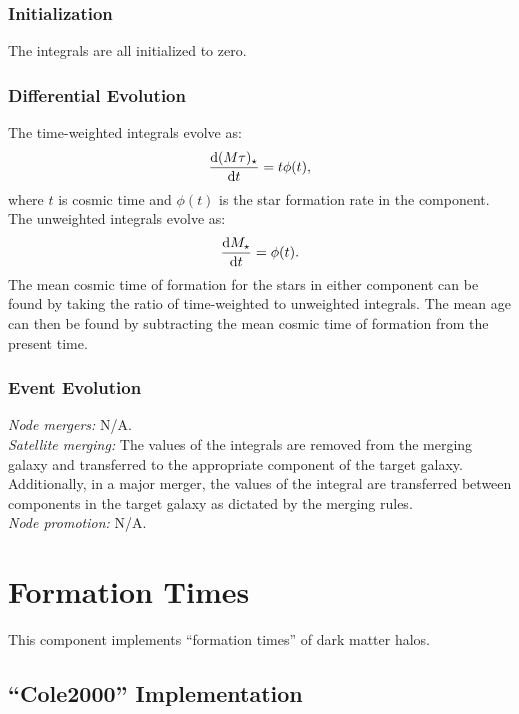 \subsubsection{Initialization}

The integrals are all initialized to zero.

\subsubsection{Differential Evolution}

The time-weighted integrals evolve as:
\begin{equation}
{{\rm d}({M\tau})_\star\over{\rm d}t} = t \phi(t),
\end{equation}
where $t$ is cosmic time and $\phi(t)$ is the star formation rate in the component. The unweighted integrals evolve as:
\begin{equation}
{{\rm d}{M}_\star\over{\rm d}t} = \phi(t).
\end{equation}
The mean cosmic time of formation for the stars in either component can be found by taking the ratio of time-weighted to unweighted integrals. The mean age can then be found by subtracting the mean cosmic time of formation from the present time.

\subsubsection{Event Evolution}

\noindent\emph{Node mergers:} N/A.\\

\noindent\emph{Satellite merging:} The values of the integrals are removed from the merging galaxy and transferred to the appropriate component of the target galaxy. Additionally, in a major merger, the values of the integral are transferred between components in the target galaxy as dictated by the merging rules.\\

\noindent\emph{Node promotion:} N/A.\\

\section{Formation Times}\label{sec:ComponentFormationTimes}

This \gls{component} implements ``formation times'' of dark matter halos.

\subsection{``Cole2000'' Implementation}

